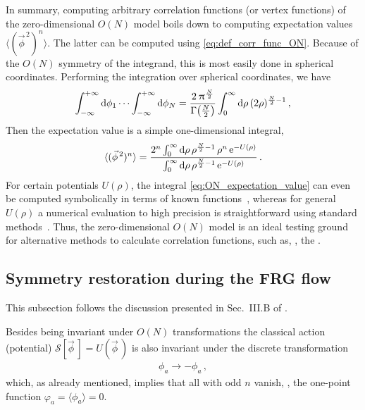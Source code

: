 In summary, computing arbitrary correlation functions (or \ipi{} vertex functions) of the zero-dimensional $O(N)$ model boils down to computing expectation values $\langle ( \vec{\phi}^{\, 2} )^n \rangle$.
The latter can be computed using \cref{eq:def_corr_func_ON}.
Because of the $O(N)$ symmetry of the integrand, this is most easily done in spherical coordinates.
Performing the integration over spherical coordinates, we have
	\begin{align}
		\int_{-\infty}^{+\infty} \dif \phi_1 \cdots \int_{-\infty}^{+\infty} \dif \phi_N 	
	= \frac{2 \, \piu^{\frac{N}{2}}}{\Gamma \big( \frac{N}{2} \big)} \int_{0}^{\infty} \dif \rho \, ( 2 \rho )^{\frac{N}{2} - 1} \, ,
	\end{align}
Then the expectation value is a simple one-dimensional integral,
	\begin{align}
		\langle ( \vec{\phi}^{\, 2} )^n \rangle = \frac{2^n \int_0^\infty \dif\rho \, \rho^{\frac{N}{2} - 1} \,  \rho^n \, \eu^{-U ( \rho )}}{\int_0^\infty \dif \rho \, \rho^{\frac{N}{2} - 1} \, \eu^{- U ( \rho )}} \, .	\label{eq:ON_expectation_value}
	\end{align}
For certain potentials $U(\rho)$, the integral \eqref{eq:ON_expectation_value} can even be computed symbolically in terms of known functions~\cite{Keitel:2011pn,Kemler:2013yka,Steil:2021cbu}, whereas for general $U ( \rho )$ a numerical evaluation to high precision is straightforward using standard methods~\cite{Press:1992zz,PresTeukVettFlan92}.
Thus, the zero-dimensional $O(N)$ model is an ideal testing ground for alternative methods to calculate correlation functions, such as, \eg{}, the \frg{}.

\subsection{Symmetry restoration during the FRG flow}\label{subsec:symmetry_restoration}
\begin{disclaimer}
	This subsection follows the discussion presented in Sec.~III.B of .
\end{disclaimer}
Besides being invariant under $O(N)$ transformations the classical action (potential) ${\mathcal{S} [ \vec{\phi} \, ] = U ( \vec{\phi} \, )}$ is also invariant under the discrete \ZII{} transformation
\begin{align}
	\phi_a \rightarrow - \phi_a \, ,
\end{align}
which, as already mentioned, implies that all \nptFunctions{} with odd $n$ vanish, \eg{}, the one-point function $\varphi_a=\langle\phi_a\rangle=0$.

